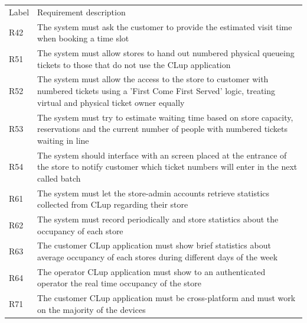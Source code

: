 \begin{tabular}{C{1cm}L{14.1cm}}
    Label & Requirement description                                                                                                                                                         \\
    R42   & The system  must ask the customer to provide the estimated visit time when booking a time slot                                                                                  \\
    R51   & The system must allow stores to hand out numbered physical queueing tickets to those that do not use the CLup application                                                       \\
    R52   & The system must allow the access to the store to customer with numbered tickets using a 'First Come First Served' logic, treating virtual and physical ticket owner equally     \\
    R53   & The system must try to estimate waiting time based on store capacity, reservations and the current number of people with numbered tickets waiting in line                       \\
    R54   & The system should interface with an screen placed at the entrance of the store to notify customer which ticket numbers will enter in the next called batch                      \\
    R61   & The system must let the store-admin accounts retrieve statistics collected from CLup regarding their store                                                                      \\
    R62   & The system must record periodically and store statistics about the occupancy of each store                                                                                      \\
    R63   & The customer CLup application must show brief statistics about average occupancy of each stores during different days of the week                                               \\
    R64   & The operator CLup application must show to an authenticated operator the real time occupancy of the store                                                                       \\
    R71   & The customer CLup application must be cross-platform and must work on the majority of the devices                                                                               \\

\end{tabular}
